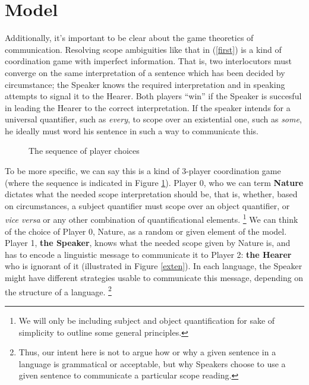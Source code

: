 \documentclass{article}
\begin{document}
\section{Model}

Additionally, it's important to be clear about the game theoretics of communication.
Resolving scope ambiguities like that in (\ref{first}) is a kind of coordination game with imperfect information.
That is, two interlocutors must converge on the same interpretation of a sentence which has been decided by circumstance;
the Speaker knows the required interpretation and in speaking attempts to signal it to the Hearer.
Both players ``win'' if the Speaker is succesful in leading the Hearer to the correct interpretation.
If the speaker intends for a universal quantifier, such as \emph{every}, to scope over an existential one, such as \emph{some}, he ideally must word his sentence in such a way to communicate this.




\begin{figure}
\begin{center}
\end{center}
	\caption{The sequence of player choices\label{seq}}
\end{figure}

To be more specific, we can say this is a kind of 3-player coordination game (where the sequence is indicated in Figure \ref{seq}).
Player 0, who we can term \textbf{Nature} dictates what the needed scope interpretation should be, that is, whether, based on circumstances, a subject quantifier must scope over an object quantifier, or \emph{vice versa} or any other combination of quantificational elements.
\footnote{We will only be including subject and object quantification for sake of simplicity to outline some general principles.}
We can think of the choice of Player 0, Nature, as a random or given element of the model.
Player 1, \textbf{the Speaker}, knows what the needed scope given by Nature is, and has to encode a linguistic message to communicate it to Player 2: \textbf{the Hearer} who is ignorant of it (illustrated in Figure \ref{exten}).
In each language, the Speaker might have different strategies usable to communicate this message, depending on the structure of a language.
\footnote{Thus, our intent here is not to argue how or why a given sentence in a language is grammatical or acceptable, but why Speakers choose to use a given sentence to communicate a particular scope reading.}
\end{document}

